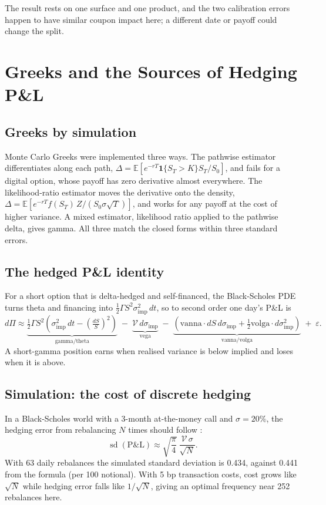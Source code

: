 \documentclass[10pt,letterpaper]{article}
\begin{document}
The result rests on one surface and one product, and the two calibration errors happen to have similar coupon impact
here; a different date or payoff could change the split.

\section{Greeks and the Sources of Hedging P\&L}\label{sec:hedging}
\subsection{Greeks by simulation}
Monte Carlo Greeks were implemented three ways. The pathwise estimator differentiates along each path,
$\Delta = \mathbb{E}[e^{-rT}\mathbf{1}\{S_T>K\}S_T/S_0]$, and fails for a digital option, whose payoff has zero derivative almost
everywhere. The likelihood-ratio estimator moves the derivative onto the density,
$\Delta = \mathbb{E}[e^{-rT}f(S_T)\,Z/(S_0\sigma\sqrt T)]$, and works for any payoff at the cost of higher variance. A mixed estimator,
likelihood ratio applied to the pathwise delta, gives gamma. All three match the closed forms within three standard errors.

\subsection{The hedged P\&L identity}
For a short option that is delta-hedged and self-financed, the Black-Scholes PDE turns theta and financing into
$\tfrac12\Gamma S^2\sigma_{\text{imp}}^2\,dt$, so to second order one day's P\&L is
\begin{equation}
d\Pi \approx \underbrace{\tfrac12\Gamma S^2\left(\sigma_{\text{imp}}^2\,dt - \left(\tfrac{dS}{S}\right)^2\right)}_{\text{gamma/theta}}
\;-\; \underbrace{\mathcal{V}\,d\sigma_{\text{imp}}}_{\text{vega}}
\;-\; \underbrace{\left(\text{vanna}\cdot dS\,d\sigma_{\text{imp}} + \tfrac12\text{volga}\cdot d\sigma_{\text{imp}}^2\right)}_{\text{vanna/volga}}
\;+\;\varepsilon .
\end{equation}
A short-gamma position earns when realised variance is below implied and loses when it is above.

\subsection{Simulation: the cost of discrete hedging}
In a Black-Scholes world with a 3-month at-the-money call and $\sigma=20\%$, the hedging error from rebalancing $N$ times
should follow \citet{kamal1999}:
\begin{equation}
\operatorname{sd}(\text{P\&L}) \approx \sqrt{\frac{\pi}{4}}\ \frac{\mathcal{V}\,\sigma}{\sqrt N}.
\end{equation}
With 63 daily rebalances the simulated standard deviation is 0.434, against 0.441 from the formula (per 100 notional). With
5 bp transaction costs, cost grows like $\sqrt N$ while hedging error falls like $1/\sqrt N$, giving an optimal frequency near
252 rebalances here.
\end{document}
